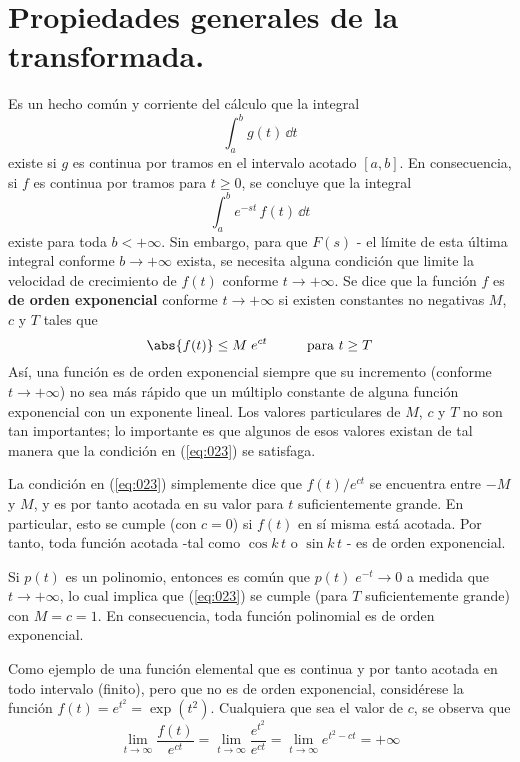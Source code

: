 \section{Propiedades generales de la transformada.}
Es un hecho común y corriente del cálculo que la integral
\[\int_{a}^{b} g(t) \, \dd t \]
existe si $g$ es continua por tramos en el intervalo acotado $[a, b]$. En consecuencia, si $f$ es continua por tramos para $t \geq 0$, se concluye que la integral
\[ \int_{a}^{b} e^{-st} \, f(t) \, \dd t \]
existe para toda $b < + \infty$. Sin embargo, para que $F(s)$  - el límite de esta última integral conforme $b \to + \infty$ exista, se necesita alguna condición que limite la velocidad de crecimiento de $f(t)$ conforme $t \to + \infty$. Se dice que la función $f$ es \textbf{de orden exponencial} conforme $t \to + \infty$ si existen constantes no negativas $M$, $c$ y $T$ tales que
\begin{equation}
\abs{f(t)} \leq M \; e^{ct} \hspace{1cm} \mbox{para } t \geq T
\label{eq:023}
\end{equation}
Así, una función es de orden exponencial siempre que su incremento (conforme $t \to + \infty$) no sea más rápido que un múltiplo constante de alguna función exponencial con un exponente lineal. Los valores particulares de $M$, $c$ y $T$ no son tan importantes; lo importante es que algunos de esos valores existan de tal manera que la condición en (\ref{eq:023}) se satisfaga.
\par
La condición en (\ref{eq:023}) simplemente dice que $f(t) / e^{ct}$ se encuentra entre $-M$ y $M$, y es por tanto acotada en su valor para $t$ suficientemente grande. En particular, esto se cumple (con $c = 0$) si $f(t)$ en sí misma está acotada. Por tanto, toda función acotada -tal como $\cos k \, t$ o $\sin k \, t$ - es de orden exponencial.
\par
Si $p(t)$ es un polinomio, entonces es común que $p(t) \; e^{-t} \to 0$ a medida que $t \to +\infty$, lo cual implica que (\ref{eq:023}) se cumple (para $T$ suficientemente grande) con $M = c = 1$. En consecuencia, toda función polinomial es de orden exponencial.
\par
Como ejemplo de una función elemental que es continua y por tanto acotada en todo intervalo (finito), pero que no es de orden exponencial, considérese la función $f(t) = e^{t^{2}} = \exp(t^{2})$. Cualquiera que sea el valor de $c$, se observa que
\[ \lim_{t \to \infty} \dfrac{f(t)}{e^{ct}} = \lim_{t \to \infty} \dfrac{e^{t^{2}}}{e^{ct}} = \lim_{t \to \infty} e^{t^{2}-ct} = + \infty  \]
